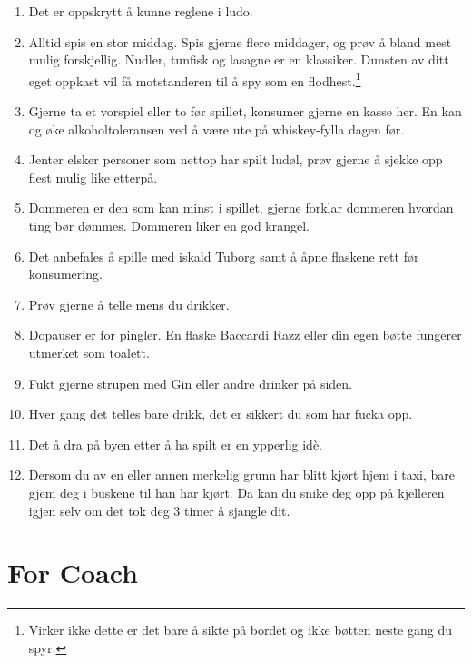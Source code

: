 \documentclass[10pt,a4paper,norsk,openany]{book}
\begin{document}
\begin{enumerate}
	\item Det er oppskrytt å kunne reglene i ludo.
    
	\item Alltid spis en stor middag. Spis gjerne flere middager, og prøv å bland
    mest mulig forskjellig. Nudler, tunfisk og lasagne er en klassiker. Dunsten av
    ditt eget oppkast vil få motstanderen til å spy som en
    flodhest.$\!$\footnote{Virker ikke dette er det bare å sikte på bordet og ikke
    bøtten neste gang du spyr.}
    
  \item Gjerne ta et vorspiel eller to før spillet, konsumer gjerne en kasse
    her. En kan og øke alkoholtoleransen ved å være ute på whiskey-fylla dagen før.
    
  \item Jenter elsker personer som nettop har spilt ludøl, prøv gjerne å
    sjekke opp flest mulig like etterpå.
    
  \item Dommeren er den som kan minst i spillet, gjerne forklar dommeren
    hvordan ting bør dømmes. Dommeren liker en god krangel.
    
  \item Det anbefales å spille med iskald Tuborg samt å åpne flaskene rett før
    konsumering.
    
  \item Prøv gjerne å telle mens du drikker. 
    
  \item Dopauser er for pingler. En flaske Baccardi Razz eller din egen bøtte
    fungerer utmerket som toalett.
    
  \item Fukt gjerne strupen med Gin eller andre drinker på siden.
    
  \item Hver gang det telles bare drikk, det er sikkert du som har fucka opp.

  \item Det å dra på byen etter å ha spilt er en ypperlig idè.

  \item Dersom du av en eller annen merkelig grunn har blitt kjørt hjem i taxi,
    bare gjem deg i buskene til han har kjørt. Da kan du snike deg opp på
    kjelleren igjen selv om det tok deg 3 timer å sjangle dit.
\end{enumerate}


\chapter{For Coach}
\end{document}
